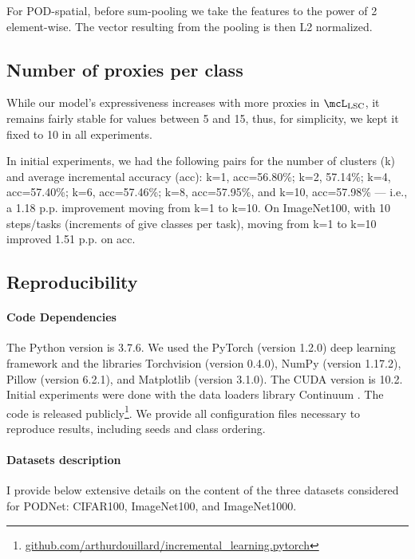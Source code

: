 For POD-spatial, before sum-pooling we take the features to the power of 2 element-wise. The vector
resulting from the pooling is then L2 normalized.

\subsection{Number of proxies per class}

While our model's expressiveness increases with more proxies in $\mcL_\text{LSC}$, it remains fairly
stable for values between 5 and 15, thus, for simplicity, we kept it fixed to 10 in all experiments.

In initial experiments, we had the following pairs for the number of clusters (k) and average
incremental accuracy (acc): k=1, acc=56.80\%; k=2, 57.14\%; k=4, acc=57.40\%; k=6, acc=57.46\%; k=8,
acc=57.95\%, and k=10, acc=57.98\% --- i.e., a 1.18 p.p. improvement moving from k=1 to k=10. On
ImageNet100, with 10 steps/tasks (increments of give classes per task), moving from k=1 to k=10
improved 1.51 p.p. on acc.

\subsection{Reproducibility}
\label{sec:appendix_podnet_repro}

\paragraph{Code Dependencies} The Python version is 3.7.6. We used the PyTorch
\citep{paszke2017pytorch} (version 1.2.0) deep learning framework and the libraries Torchvision
(version 0.4.0), NumPy \citep{oliphant2006numpy} (version 1.17.2), Pillow (version 6.2.1), and
Matplotlib \citep{hunter2007matplotlib} (version 3.1.0). The CUDA version is 10.2. Initial
experiments were done with the data loaders library Continuum \citep{douillardlesort2021continuum}.
The code is released publicly\footnote{\href{https://github.com/arthurdouillard/incremental_learning.pytorch}{\scriptsize{github.com/arthurdouillard/incremental\_learning.pytorch}}}.
We provide all configuration files necessary to reproduce results, including seeds and class
ordering.

\paragraph{Datasets description} I provide below extensive details on the content of the three
datasets considered for PODNet: CIFAR100, ImageNet100, and ImageNet1000.

